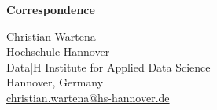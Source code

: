 \documentclass{jlcl}
\begin{document}




\clearpage



\noindent \textbf{Correspondence}

\hspace{12pt}

\noindent Christian Wartena  \\[0.5\baselineskip]
Hochschule Hannover \\
Data|H Institute for Applied Data Science\\ 
Hannover, Germany\\
\href{mailto: christian.wartena@hs-hannover.de}{christian.wartena@hs-hannover.de}
\end{document}
